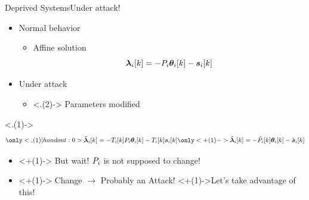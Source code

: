 \documentclass[handout,aspectratio=169]{beamer}
\begin{document}
\begin{frame}{Deprived Systems}{Under attack!}
  \begin{minipage}[t]{.45\linewidth}
    \begin{itemize}[<+->]
      \item Normal behavior
            \begin{itemize}
              \item Affine solution
                    \begin{equation*}
                      \lambdaik=-\Plin\thetaik-\sik
                    \end{equation*}
            \end{itemize}
    \end{itemize}
  \end{minipage}
  \hfill
  \begin{minipage}[t]{.45\linewidth}
    \begin{itemize}
      \item<+-> Under attack \onslide<+->{$\to$ $\lambdaicheat=\Tik\lambdai$}
            \begin{itemize}
              \item<.(2)-> Parameters modified
            \end{itemize}
    \end{itemize}
    \only<.(1)->{
      \begin{equation*}
        \only<.(1)|handout:0>{\lambdaicheat[k]=-\Tik\Plin\thetaik-\Tik\sik}
        \only<+(1)->{\lambdaicheat[k]=-\Plintilde\thetaik-\siktilde}
      \end{equation*}
    }
  \end{minipage}
  \centering
  \begin{itemize}
    \item<+(1)-> But wait! ${P}_{i}$ is not supposed to change!
    \item<+(1)-> Change $\to$ Probably an Attack! \onslide<+(1)->{Let's take advantage of this!}
  \end{itemize}
\end{frame}
\end{document}
